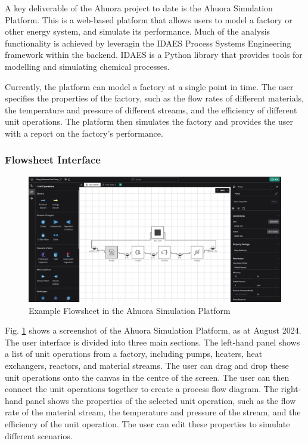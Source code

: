 A key deliverable of the Ahuora project to date is the Ahuora Simulation Platform. This is a web-based platform that allows users to model a factory or other energy system, and simulate its performance. Much of the analysis functionality is achieved by leveragin the IDAES Process Systems Engineering framework within the backend. IDAES is a Python library that provides tools for modelling and simulating chemical processes.

Currently, the platform can model a factory at a single point in time. The user specifies the properties of the factory, such as the flow rates of different materials, the temperature and pressure of different streams, and the efficiency of different unit operations. The platform then simulates the factory and provides the user with a report on the factory's performance.

\subsubsection{Flowsheet Interface}
\begin{figure}
    \centering
    \includegraphics[width=\textwidth]{preface/platform_screenshot.png}
    \caption{Example Flowsheet in the Ahuora Simulation Platform}
    \label{fig:platform}
\end{figure}

Fig. \ref{fig:platform} shows a screenshot of the Ahuora Simulation Platform, as at August 2024. The user interface is divided into three main sections. The left-hand panel shows a list of unit operations from a factory, including pumps, heaters, heat exchangers, reactors, and material streams. The user can drag and drop these unit operations onto the canvas in the centre of the screen. The user can then connect the unit operations together to create a process flow diagram. The right-hand panel shows the properties of the selected unit operation, such as the flow rate of the material stream, the temperature and pressure of the stream, and the efficiency of the unit operation. The user can edit these properties to simulate different scenarios.

